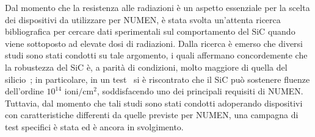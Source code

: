
Dal momento che la resistenza alle radiazioni è un aspetto essenziale per la scelta dei dispositivi da utilizzare per NUMEN, è stata svolta un'attenta ricerca bibliografica per cercare dati sperimentali sul comportamento del SiC quando viene sottoposto ad elevate dosi di radiazioni.
Dalla ricerca è emerso che diversi studi sono stati condotti su tale argomento, i quali affermano concordemente che la robustezza del SiC è, a parità di condizioni, molto maggiore di quella del silicio~\cite{garcialopez:nimb16, nava:nima03}; in particolare, in un test~\cite{raciti:npa10} si è riscontrato che il SiC può sostenere fluenze dell'ordine $10^{14}$  $\mbox{ioni}/\mbox{cm}^2$, soddisfacendo uno dei principali requisiti di NUMEN.
Tuttavia, dal momento che tali studi sono stati condotti adoperando dispositivi con caratteristiche differenti da quelle previste per NUMEN, una campagna di test specifici è stata ed è ancora in svolgimento.

